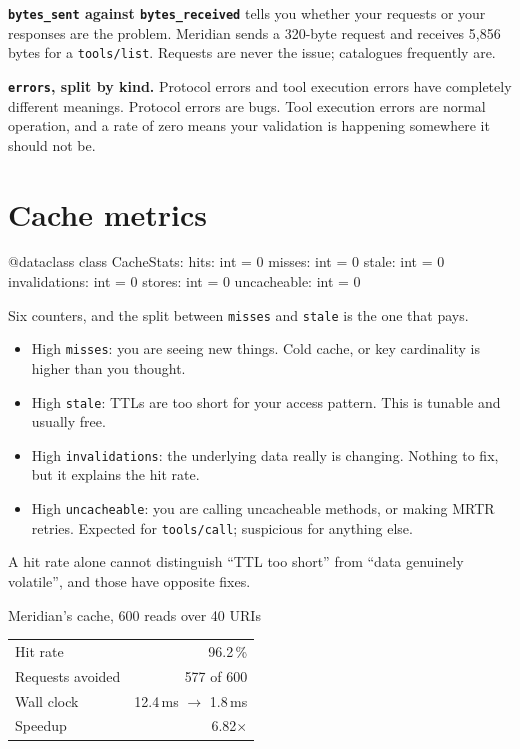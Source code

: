\textbf{\texttt{bytes\_sent} against \texttt{bytes\_received}} tells you whether
your requests or your responses are the problem. Meridian sends a 320-byte
request and receives 5,856 bytes for a \texttt{tools/list}. Requests are never
the issue; catalogues frequently are.

\textbf{\texttt{errors}, split by kind.} Protocol errors and tool execution
errors have completely different meanings. Protocol errors are bugs. Tool
execution errors are normal operation, and a rate of zero means your validation
is happening somewhere it should not be.

\section{Cache metrics}

\begin{py}
@dataclass
class CacheStats:
    hits: int = 0
    misses: int = 0
    stale: int = 0
    invalidations: int = 0
    stores: int = 0
    uncacheable: int = 0
\end{py}

Six counters, and the split between \texttt{misses} and \texttt{stale} is the
one that pays.

\begin{itemize}[leftmargin=1.6em, itemsep=3pt]
\item High \texttt{misses}: you are seeing new things. Cold cache, or key
cardinality is higher than you thought.
\item High \texttt{stale}: TTLs are too short for your access pattern. This is
tunable and usually free.
\item High \texttt{invalidations}: the underlying data really is changing.
Nothing to fix, but it explains the hit rate.
\item High \texttt{uncacheable}: you are calling uncacheable methods, or making
MRTR retries. Expected for \texttt{tools/call}; suspicious for anything else.
\end{itemize}

A hit rate alone cannot distinguish ``TTL too short'' from ``data genuinely
volatile'', and those have opposite fixes.

\begin{measurebox}{Meridian's cache, 600 reads over 40 URIs}
\begin{tabular}{@{}lr@{}}
\toprule
Hit rate            & 96.2\,\% \\
Requests avoided    & 577 of 600 \\
Wall clock          & 12.4\,ms $\rightarrow$ 1.8\,ms \\
Speedup             & 6.82$\times$ \\
\bottomrule
\end{tabular}
\end{measurebox}

